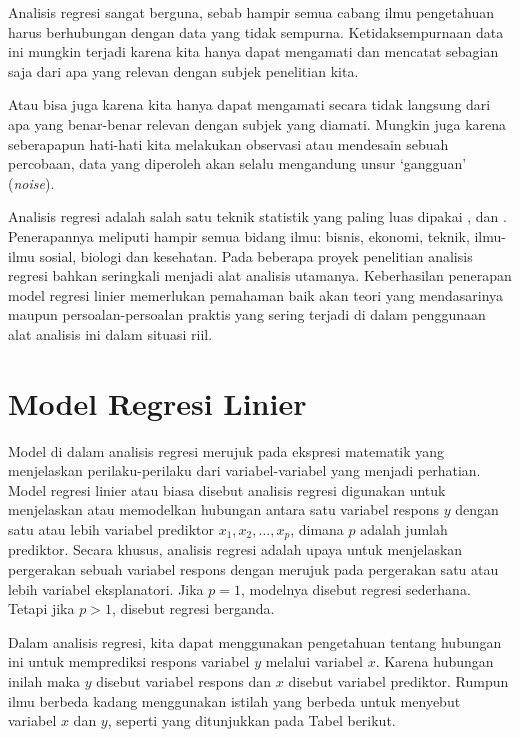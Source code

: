 \documentclass[
]{book}
\begin{document}
Analisis regresi sangat berguna, sebab hampir semua cabang ilmu
pengetahuan harus berhubungan dengan data yang tidak sempurna.
Ketidaksempurnaan data ini mungkin terjadi karena kita hanya dapat
mengamati dan mencatat sebagian saja dari apa yang relevan dengan subjek
penelitian kita.

Atau bisa juga karena kita hanya dapat mengamati secara tidak langsung
dari apa yang benar-benar relevan dengan subjek yang diamati. Mungkin
juga karena seberapapun hati-hati kita melakukan observasi atau
mendesain sebuah percobaan, data yang diperoleh akan selalu mengandung
unsur `gangguan' (\emph{noise}).

Analisis regresi adalah salah satu teknik statistik yang paling luas dipakai \citep{agresti2015}, \citep{frees2010} dan \citep{lee2013}.
Penerapannya meliputi hampir semua bidang ilmu: bisnis, ekonomi, teknik,
ilmu-ilmu sosial, biologi dan kesehatan. Pada beberapa proyek penelitian
analisis regresi bahkan seringkali menjadi alat analisis utamanya.
Keberhasilan penerapan model regresi linier memerlukan pemahaman baik
akan teori yang mendasarinya maupun persoalan-persoalan praktis yang
sering terjadi di dalam penggunaan alat analisis ini dalam situasi riil.

\hypertarget{model-regresi-linier}{%
\section{Model Regresi Linier}\label{model-regresi-linier}}

Model di dalam analisis regresi merujuk pada ekspresi matematik yang
menjelaskan perilaku-perilaku dari variabel-variabel yang menjadi
perhatian. Model regresi linier atau biasa disebut analisis regresi
\citep{faraway2015b} digunakan untuk menjelaskan atau memodelkan hubungan
antara satu variabel respons \(y\) dengan satu atau lebih variabel
prediktor \(x_1, x_2, ... , x_p\), dimana \(p\) adalah jumlah prediktor.
Secara khusus, analisis regresi adalah upaya untuk menjelaskan
pergerakan sebuah variabel respons dengan merujuk pada pergerakan satu
atau lebih variabel eksplanatori. Jika \(p=1\), modelnya disebut regresi
sederhana. Tetapi jika \(p>1\), disebut regresi berganda.

Dalam analisis regresi, kita dapat menggunakan pengetahuan tentang
hubungan ini untuk memprediksi respons variabel \(y\) melalui variabel
\(x\). Karena hubungan inilah maka \(y\) disebut variabel respons dan \(x\)
disebut variabel prediktor. Rumpun ilmu berbeda kadang menggunakan
istilah yang berbeda untuk menyebut variabel \(x\) dan \(y\), seperti yang ditunjukkan pada Tabel berikut.
\end{document}
